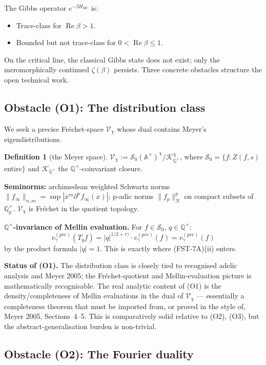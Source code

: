 \documentclass[11pt,a4paper]{article}
\theoremstyle{plain}
\theoremstyle{definition}
\newtheorem{definition}[theorem]{Definition}
\newcommand{\Q}{\mathbb{Q}}
\newcommand{\A}{\mathbb{A}}
\newcommand{\V}{\mathcal{V}}
\renewcommand{\S}{\mathcal{S}}
\newcommand{\K}{\mathcal{K}}
\newcommand{\chifn}{\chi}
\renewcommand{\Re}{\operatorname{Re}}
\begin{document}
The Gibbs operator $e^{-\beta H_{BC}}$ is:
\begin{itemize}
\item Trace-class for $\Re\beta > 1$.
\item Bounded but not trace-class for $0 < \Re\beta \leq 1$.
\end{itemize}

On the critical line, the classical Gibbs state does not exist;
only the meromorphically continued $\zeta(\beta)$ persists.  Three
concrete obstacles structure the open technical work.

\subsection{Obstacle (O1): The distribution class}

We seek a precise Fr\'echet-space $\V_\chifn$ whose dual contains
Meyer's eigendistributions.

\begin{definition}[the Meyer space]
\label{def:meyer-space}
$\V_\chifn := \S_0(\A^\times)^\chifn / \K_{\Q^\times}^\chifn$,
where $\S_0 = \{f : Z(f, s)$ entire$\}$ and $\K_{\Q^\times}$ the
$\Q^\times$-coinvariant closure.
\end{definition}

\textbf{Seminorms:} archimedean weighted Schwartz norms
$\|f_\infty\|_{n,m} = \sup |x^m \partial^n f_\infty(x)|$; p-adic
norms $\|f_p\|_N^p$ on compact subsets of $\Q_p^\times$.
$\V_\chifn$ is Fr\'echet in the quotient topology.

\textbf{$\Q^\times$-invariance of Mellin evaluation.}  For $f \in
\S_0$, $q \in \Q^\times$:
\[
  v_\gamma^{(pre)}(T_q f) = |q|^{1/2+i\gamma} \cdot
    v_\gamma^{(pre)}(f) = v_\gamma^{(pre)}(f)
\]
by the product formula $|q| = 1$.  This is exactly where (FST-7A)(ii)
enters.

\textbf{Status of (O1).}  The distribution class is closely tied to
recognised adelic analysis and Meyer 2005; the Fr\'echet-quotient
and Mellin-evaluation picture is mathematically recognisable.  The
real analytic content of (O1) is the density/completeness of Mellin
evaluations in the dual of $\V_\chifn$ --- essentially a completeness
theorem that must be imported from, or proved in the style of,
Meyer 2005, Sections~4--5.  This is comparatively solid relative to (O2),
(O3), but the abstract-generalisation burden is non-trivial.

\subsection{Obstacle (O2): The Fourier duality}
\end{document}
